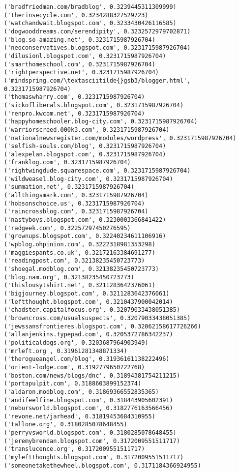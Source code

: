 \documentclass[11pt]{article}
\begin{document}
\begin{Verbatim}[commandchars=\\\{\}]
('bradfriedman.com/bradblog', 0.3239445311309999)
('therinsecycle.com', 0.3234288327529723)
('watchandwait.blogspot.com', 0.3233430426116585)
('dogwooddreams.com/serendipity', 0.3232572979702871)
('blog.so-amazing.net', 0.3231715987926704)
('neoconservatives.blogspot.com', 0.3231715987926704)
('dilusionl.blogspot.com', 0.3231715987926704)
('smarthomeschool.com', 0.3231715987926704)
('rightperspective.net', 0.3231715987926704)
('mindspring.com/\textasciitilde{}gsb3/blogger.html', 0.3231715987926704)
('thomaswharry.com', 0.3231715987926704)
('sickofliberals.blogspot.com', 0.3231715987926704)
('renpro.kwcom.net', 0.3231715987926704)
('happyhomeschooler.blog-city.com', 0.3231715987926704)
('warriorscreed.000k3.com', 0.3231715987926704)
('nationalnewsregister.com/modules/wordpress', 0.3231715987926704)
('selfish-souls.com/blog', 0.3231715987926704)
('alexpelan.blogspot.com', 0.3231715987926704)
('franklog.com', 0.3231715987926704)
('rightwingdude.squarespace.com', 0.3231715987926704)
('wildweasel.blog-city.com', 0.3231715987926704)
('summation.net', 0.3231715987926704)
('allthingsmark.com', 0.3231715987926704)
('hobsonschoice.us', 0.3231715987926704)
('raincrossblog.com', 0.3231715987926704)
('nastyboys.blogspot.com', 0.3230003366841422)
('radgeek.com', 0.32257297450276595)
('grownups.blogspot.com', 0.32240234611106916)
('wpblog.ohpinion.com', 0.3222318981353298)
('maggiespants.co.uk', 0.32172163384691277)
('readingpost.com', 0.32138235450723773)
('shoegal.modblog.com', 0.32138235450723773)
('blog.nam.org', 0.32138235450723773)
('thislousytshirt.net', 0.3211283642376061)
('bigjourney.blogspot.com', 0.3211283642376061)
('leftthought.blogspot.com', 0.3210437900042014)
('chadster.capitalfocus.org', 0.32079033438051385)
('browncross.com/usualsuspects', 0.32079033438051385)
('jewssansfrontieres.blogspot.com', 0.32062158617726266)
('allanjenkins.typepad.com', 0.3205372786342237)
('politicaldogs.org', 0.3203687964903949)
('mrleft.org', 0.31961281348871334)
('therogueangel.com/blog', 0.31936161138222496)
('orient-lodge.com', 0.3192779650722768)
('boston.com/news/blogs/dnc', 0.31894381754211215)
('portapulpit.com', 0.3188603899152374)
('aldaron.modblog.com', 0.31869366552835365)
('andifeelfine.blogspot.com', 0.318443905602391)
('nebursworld.blogspot.com', 0.3182776163566456)
('revone.net/jarhead', 0.31819453684310955)
('tallone.org', 0.3180285078648455)
('perryvsworld.blogspot.com', 0.3180285078648455)
('jeremybrendan.blogspot.com', 0.3172009551511717)
('translucence.org', 0.3172009551511717)
('myleftthoughts.blogspot.com', 0.3172009551511717)
('someonetakethewheel.blogspot.com', 0.3171184366924955)

\end{Verbatim}
\end{document}
